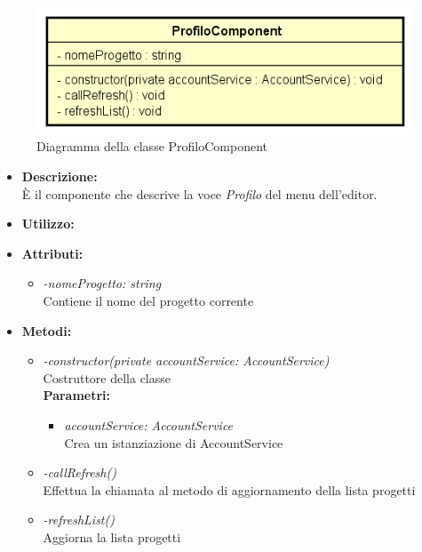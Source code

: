 \begin{figure}[h!]
	\centering
	\includegraphics[scale=0.8]{res/sections/SpecificaFrontEnd/Components/Disegnetti/profilo.png}
	\caption{Diagramma della classe ProfiloComponent}
\end{figure}

\begin{itemize}
	\item \textbf{Descrizione:}\\
	È il componente che descrive la voce \textit{Profilo} del menu dell'editor.
	\item \textbf{Utilizzo:}\\
	
	\item \textbf{Attributi:}
		\begin{itemize}
			\item \emph{-nomeProgetto: string}\\
			Contiene il nome del progetto corrente
		\end{itemize}
	\item \textbf{Metodi:}
		\begin{itemize}
			\item \emph{-constructor(private accountService: AccountService)}\\
    		Costruttore della classe\\
    		\textbf{Parametri:}
    		\begin{itemize}
    			\item \emph{accountService: AccountService}\\
    			Crea un istanziazione di AccountService
    		\end{itemize}
    		\item \emph{-callRefresh()}\\
    		Effettua la chiamata al metodo di aggiornamento della lista progetti\\
    		\item \emph{-refreshList()}\\
    		Aggiorna la lista progetti
		\end{itemize}
\end{itemize}